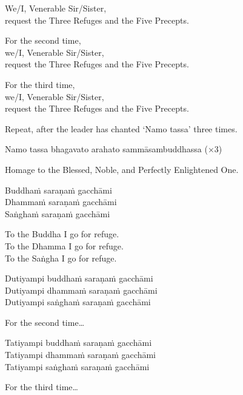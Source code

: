 \begin{english}
  We/I, Venerable Sir/Sister,\\
  request the Three Refuges and the Five Precepts.

  For the second time,\\
  we/I, Venerable Sir/Sister,\\
  request the Three Refuges and the Five Precepts.

  For the third time,\\
  we/I, Venerable Sir/Sister,\\
  request the Three Refuges and the Five Precepts.
\end{english}

\ifreferenceedition
\clearpage
\fi

\begin{instruction}
  Repeat, after the leader has chanted ‘Namo tassa’ three times.
\end{instruction}

Namo tassa bhagavato arahato sammāsambuddhassa (×3)

\begin{english}
  Homage to the Blessed, Noble, and Perfectly Enlightened One.
\end{english}

\ifhandbookedition
\clearpage
\fi

Buddhaṁ saraṇaṁ gacchāmi\\
Dhammaṁ saraṇaṁ gacchāmi\\
Saṅghaṁ saraṇaṁ gacchāmi

\begin{english}
  To the Buddha I go for refuge.\\
  To the Dhamma I go for refuge.\\
  To the Saṅgha I go for refuge.
\end{english}

Dutiyampi buddhaṁ saraṇaṁ gacchāmi\\
Dutiyampi dhammaṁ saraṇaṁ gacchāmi\\
Dutiyampi saṅghaṁ saraṇaṁ gacchāmi

\begin{english}
  For the second time\ldots
\end{english}

Tatiyampi buddhaṁ saraṇaṁ gacchāmi\\
Tatiyampi dhammaṁ saraṇaṁ gacchāmi\\
Tatiyampi saṅghaṁ saraṇaṁ gacchāmi

\begin{english}
  For the third time\ldots
\end{english}

